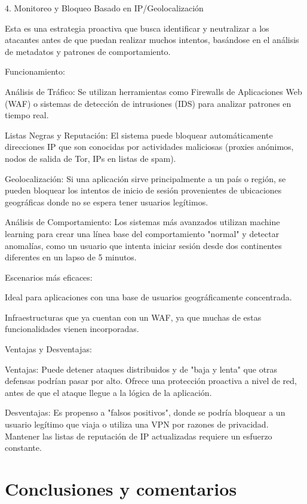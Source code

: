 \documentclass[letter,12pt]{article}
\begin{document}
4. Monitoreo y Bloqueo Basado en IP/Geolocalización

Esta es una estrategia proactiva que busca identificar y neutralizar a los atacantes antes de que puedan realizar muchos intentos, basándose en el análisis de metadatos y patrones de comportamiento.

    Funcionamiento:

        Análisis de Tráfico: Se utilizan herramientas como Firewalls de Aplicaciones Web (WAF) o sistemas de detección de intrusiones (IDS) para analizar patrones en tiempo real.

        Listas Negras y Reputación: El sistema puede bloquear automáticamente direcciones IP que son conocidas por actividades maliciosas (proxies anónimos, nodos de salida de Tor, IPs en listas de spam).

        Geolocalización: Si una aplicación sirve principalmente a un país o región, se pueden bloquear los intentos de inicio de sesión provenientes de ubicaciones geográficas donde no se espera tener usuarios legítimos.

        Análisis de Comportamiento: Los sistemas más avanzados utilizan machine learning para crear una línea base del comportamiento "normal" y detectar anomalías, como un usuario que intenta iniciar sesión desde dos continentes diferentes en un lapso de 5 minutos.

    Escenarios más eficaces:

        Ideal para aplicaciones con una base de usuarios geográficamente concentrada.

        Infraestructuras que ya cuentan con un WAF, ya que muchas de estas funcionalidades vienen incorporadas.

    Ventajas y Desventajas:

        Ventajas: Puede detener ataques distribuidos y de "baja y lenta" que otras defensas podrían pasar por alto. Ofrece una protección proactiva a nivel de red, antes de que el ataque llegue a la lógica de la aplicación.

        Desventajas: Es propenso a "falsos positivos", donde se podría bloquear a un usuario legítimo que viaja o utiliza una VPN por razones de privacidad. Mantener las listas de reputación de IP actualizadas requiere un esfuerzo constante.

\section*{Conclusiones y comentarios}
\end{document}
